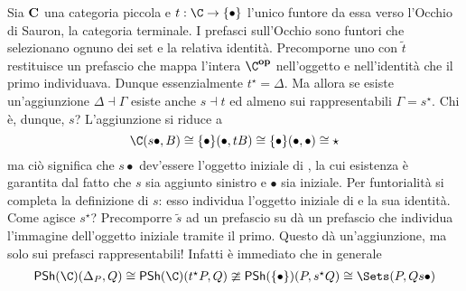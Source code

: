 Sia $\bf C$ una categoria piccola e $t:\C\rightarrow\{\bullet\}$ l'unico funtore da essa verso l'Occhio di Sauron, la categoria terminale. I prefasci sull'Occhio sono funtori che selezionano ognuno dei set e la relativa identità. Precomporne uno con $\tilde{t}$ restituisce un prefascio che mappa l'intera $\C^{\bf op}$ nell'oggetto e nell'identità che il primo individuava. Dunque essenzialmente $t^\star=\Delta$. Ma allora se esiste un'aggiunzione $\Delta\dashv\Gamma$ esiste anche $s\dashv t$ ed almeno sui rappresentabili $\Gamma=s^\star$. 
Chi è, dunque, $s$? L'aggiunzione si riduce a
\[
\C(s\bullet,B)
\cong
\{\bullet\}(\bullet,tB)
\cong
\{\bullet\}(\bullet,\bullet)
\cong
\star
\]
ma ciò significa che $s\bullet$ dev'essere l'oggetto iniziale di \C, la cui esistenza è garantita dal fatto che $s$ sia aggiunto sinistro e $\bullet$ sia iniziale. Per funtorialità si completa la definizione di $s$: esso individua l'oggetto iniziale di \C e la sua identità. Come agisce $s^\star$? Precomporre $\tilde{s}$ ad un prefascio su \C dà un prefascio che individua l'immagine dell'oggetto iniziale tramite il primo. Questo dà un'aggiunzione, ma solo sui prefasci rappresentabili! Infatti è immediato che in generale
\[\begin{array}{c}
\textsf{PSh}(\C)( \Delta_P, Q )
\cong
\textsf{PSh}(\C)( t^\star P, Q )
\ncong
\textsf{PSh}(\{\bullet\})( P, s^\star Q )
\cong
\Sets( P, Qs\bullet )
\end{array}\]



